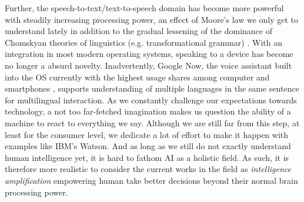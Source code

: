 Further, the speech-to-text/text-to-speech domain has become more powerful with steadily increasing processing power, an effect of Moore's law we only get to understand lately in addition to the gradual lessening of the dominance of Chomskyan theories of linguistics (e.g. transformational grammar) \cite{wiki:nlp}.
With an integration in most modern operating systems, speaking to a device has become no longer a absurd novelty. Inadvertently, Google Now, the voice assistant built into the OS currently with the highest usage shares among computer and smartphones \cite{wiki:gartnerreports}, supports understanding of multiple languages in the same sentence for multilingual interaction.
As we constantly challenge our expectations towards technology, a not too far-fetched imagination makes us question the ability of a machine to react to everything we say.
Although we are still far from this step, at least for the consumer level, we dedicate a lot of effort to make it happen with examples like IBM's Watson.
And as long as we still do not exactly understand human intelligence yet, it is hard to fathom AI as a holistic field. As such, it is therefore more realistic to consider the current works in the field as \textit{intelligence amplification} \cite{alexapc18} empowering human take better decisions beyond their normal brain processing power.
\\




 

